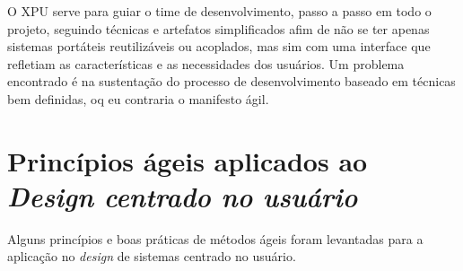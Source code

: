 O XPU serve para guiar o time de desenvolvimento, passo a passo em todo o projeto, seguindo técnicas e artefatos simplificados afim de não se ter apenas sistemas portáteis reutilizáveis ou acoplados, mas sim com uma interface que refletiam as características e as necessidades dos usuários. Um problema encontrado é na sustentação do processo de desenvolvimento baseado em técnicas bem definidas, oq eu contraria o manifesto ágil.


\section{Princípios ágeis aplicados ao \emph{Design centrado no usuário}}

	Alguns princípios e boas práticas de métodos ágeis foram levantadas para a aplicação no \emph{design} de sistemas centrado no usuário.

